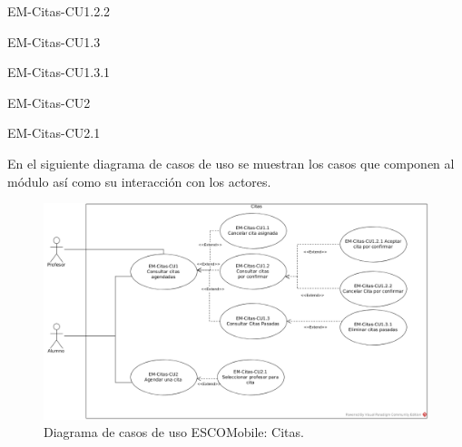 \begin{requisitos}{EM-Citas-CU1.2.2}
\end{requisitos}

\begin{requisitos}{EM-Citas-CU1.3}
\end{requisitos}

\begin{requisitos}{EM-Citas-CU1.3.1}
\end{requisitos}

\begin{requisitos}{EM-Citas-CU2}
\end{requisitos}

\begin{requisitos}{EM-Citas-CU2.1}
\end{requisitos}

\noindent
En el siguiente diagrama de casos de uso se muestran los casos que componen al módulo así 
como su interacción con los actores.

\pagebreak
\begin{figure}[htbp!]
	\centering
	\includegraphics[width=1\textwidth]{images/casos/cita}
	\caption{Diagrama de casos de uso ESCOMobile: Citas.}
\end{figure}




